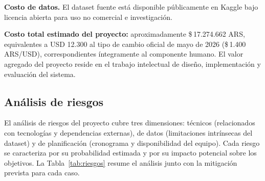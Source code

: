 \textbf{Costo de datos.} El dataset fuente \parencite{nakhaee_2020_spotify_lyrics} está disponible públicamente en Kaggle bajo licencia abierta para uso no comercial e investigación.

\textbf{Costo total estimado del proyecto:} aproximadamente \$\,17.274.662 ARS, equivalentes a USD 12.300 al tipo de cambio oficial de mayo de 2026 (\$\,1.400 ARS/USD), correspondientes íntegramente al componente humano. El valor agregado del proyecto reside en el trabajo intelectual de diseño, implementación y evaluación del sistema.

\subsection{Análisis de riesgos}
\label{subsec:riesgos}

El análisis de riesgos del proyecto cubre tres dimensiones: técnicos (relacionados con tecnologías y dependencias externas), de datos (limitaciones intrínsecas del dataset) y de planificación (cronograma y disponibilidad del equipo). Cada riesgo se caracteriza por su probabilidad estimada y por su impacto potencial sobre los objetivos. La Tabla~\ref{tab:riesgos} resume el análisis junto con la mitigación prevista para cada caso.

